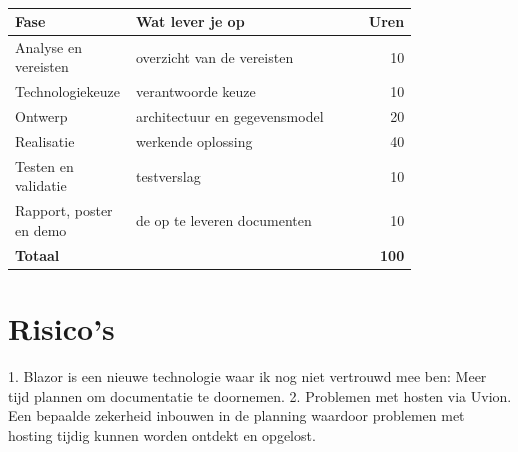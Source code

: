 \begin{table}[htbp]
  \centering
  \begin{tabular}{@{}>{\raggedright\arraybackslash}p{0.3\linewidth}>{\raggedright\arraybackslash}p{0.5\linewidth}r@{}}
    \toprule
    \textbf{Fase} & \textbf{Wat lever je op} & \textbf{Uren} \\
    \midrule
    Analyse en vereisten & overzicht van de vereisten   & 10  \\
    Technologiekeuze     & verantwoorde keuze           & 10  \\
    Ontwerp              & architectuur en gegevensmodel& 20  \\
    Realisatie           & werkende oplossing           & 40  \\
    Testen en validatie  & testverslag                  & 10  \\
    Rapport, poster en demo & de op te leveren documenten  & 10  \\
    \midrule
    \textbf{Totaal}           &                              & \textbf{100} \\
    \bottomrule
  \end{tabular}
  \caption[Planning en werkbelasting]{\label{tab:vst-planning}%
    }
\end{table}


\section{Risico's}%
\label{vst:risicos}

1. Blazor is een nieuwe technologie waar ik nog niet vertrouwd mee ben: Meer tijd plannen om documentatie te doornemen. 
2. Problemen met hosten via Uvion. Een bepaalde zekerheid inbouwen in de planning waardoor problemen met hosting tijdig kunnen worden ontdekt en opgelost.

